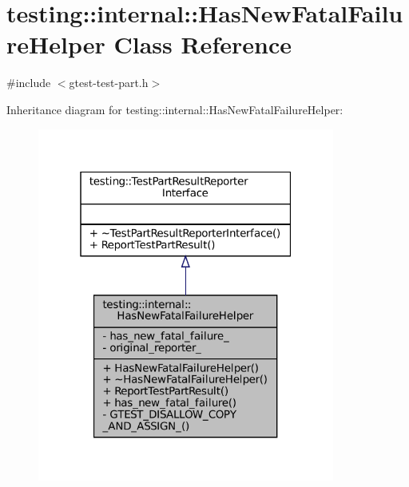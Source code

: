 \hypertarget{classtesting_1_1internal_1_1HasNewFatalFailureHelper}{}\section{testing\+:\+:internal\+:\+:Has\+New\+Fatal\+Failure\+Helper Class Reference}
\label{classtesting_1_1internal_1_1HasNewFatalFailureHelper}


{\ttfamily \#include $<$gtest-\/test-\/part.\+h$>$}



Inheritance diagram for testing\+:\+:internal\+:\+:Has\+New\+Fatal\+Failure\+Helper\+:
\nopagebreak
\begin{figure}[H]
\begin{center}
\leavevmode
\includegraphics[width=277pt]{classtesting_1_1internal_1_1HasNewFatalFailureHelper__inherit__graph}
\end{center}
\end{figure}


